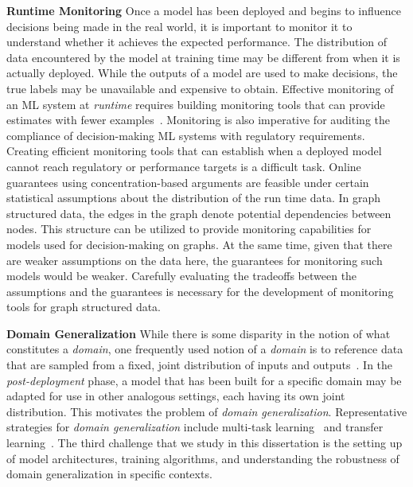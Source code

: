 \noindent \textbf{Runtime Monitoring}
Once a model has been deployed and begins to influence decisions being made in the real world, it is important to monitor it to understand whether it achieves the expected performance.
The distribution of data encountered by the model at training time may be different from when it is actually deployed. 
While the outputs of a model are used to make decisions, the true labels may be unavailable and expensive to obtain.
Effective monitoring of an ML system at \textit{runtime} requires building monitoring tools that can provide estimates with fewer examples~\citep{ginart2022mldemon}.
Monitoring is also imperative for auditing the compliance of decision-making ML systems with regulatory requirements.
Creating efficient monitoring tools that can establish when a deployed model cannot reach regulatory or performance targets is a difficult task.
Online guarantees using concentration-based arguments are feasible under certain statistical assumptions about the distribution of the run time data.
In graph structured data, the edges in the graph denote potential dependencies between nodes.
This structure can be utilized to provide monitoring capabilities for models used for decision-making on graphs.
At the same time, given that there are weaker assumptions on the data here, the guarantees for monitoring such models would be weaker.
Carefully evaluating the tradeoffs between the assumptions and the guarantees is necessary for the development of monitoring tools for graph structured data.

\noindent \textbf{Domain Generalization}
While there is some disparity in the notion of what constitutes a \textit{domain}, one frequently used notion of a \textit{domain} is to reference data that are sampled from a fixed, joint distribution of inputs and outputs~\cite{wang2022generalizing}.
In the \textit{post-deployment} phase, a model that has been built for a specific domain may be adapted for use in other analogous settings, each having its own joint distribution.
This motivates the problem of \textit{domain generalization}. 
Representative strategies for \textit{domain generalization} include multi-task learning~\cite{caruana1997multitask} and transfer learning~\cite{zhuang2020comprehensive}.
The third challenge that we study in this dissertation is the setting up of model architectures, training algorithms, and understanding the robustness of domain generalization in specific contexts.

